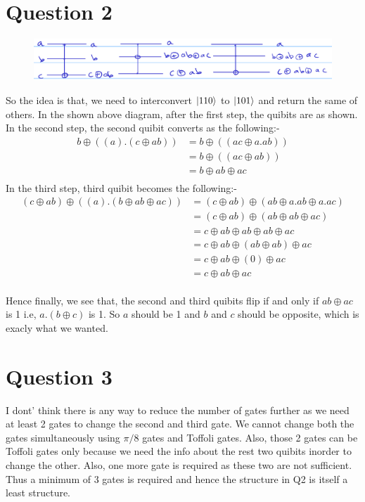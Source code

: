\documentclass{article}
\DeclarePairedDelimiter\ket{\lvert}{\rangle}
\begin{document}
    \section*{Question 2}
      \begin{figure}[ht]
        \includegraphics[width=1\textwidth]{q2.png}      
          \centering   
      \end{figure}
      So the idea is that, we need to interconvert $\ket*{110}$ to $\ket*{101}$ and return the same of others. In the shown above diagram, after the first step, the quibits are as shown. In the second step, the second quibit converts as the following:-
      \begin{align*}
        b \oplus ((a).(c \oplus ab)) &= b \oplus ((ac \oplus a.ab)) \\
        &= b \oplus ((ac \oplus ab)) \\
        &= b \oplus ab \oplus ac \\
      \end{align*}
      In the third step, third quibit becomes the following:-
      \begin{align*}
        (c \oplus ab) \oplus ((a).(b \oplus ab \oplus ac)) &= (c \oplus ab) \oplus (ab \oplus a.ab \oplus a.ac) \\
        &= (c \oplus ab) \oplus (ab \oplus ab \oplus ac) \\
        &= c \oplus ab \oplus ab \oplus ab \oplus ac \\
        &= c \oplus ab \oplus (ab \oplus ab) \oplus ac \\
        &= c \oplus ab \oplus (0) \oplus ac \\
        &= c \oplus ab \oplus ac \\
      \end{align*}

      Hence finally, we see that, the second and third quibits flip if and only if $ab \oplus ac$ is 1 i.e, $a.(b \oplus c)$ is 1. So $a$ should be 1 and $b$ and $c$ should be opposite, which is exacly what we wanted.

      \section*{Question 3}
      I dont' think there is any way to reduce the number of gates further as we need at least 2 gates to change the second and third gate. We cannot change both the gates simultaneously using $\pi/8$ gates and Toffoli gates. Also, those 2 gates can be Toffoli gates only because we need the info about the rest two quibits inorder to change the other. Also, one more gate is required as these two are not sufficient. \\
      Thus a minimum of 3 gates is required and hence the structure in Q2 is itself a least structure.
\end{document}
